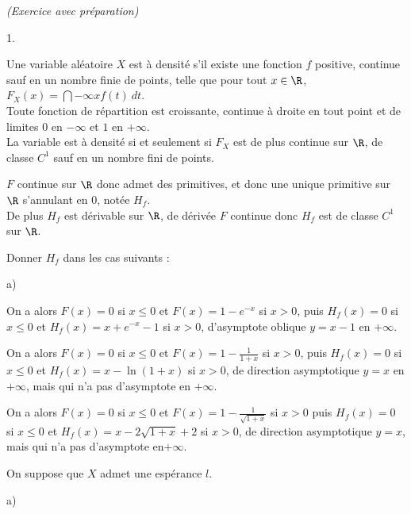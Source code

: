 \documentclass[11pt]{article}%
\begin{document}
 \newpage

 \begin{exercice}{\it (Exercice avec préparation)}~
 \begin{noliste}{1.}
 \setlength{\itemsep}{4mm}
 \item Une variable aléatoire $X$ est à densité s'il existe une
fonction $f$ positive, continue sauf en un nombre finie de points,
telle que pour tout $x \in \R$, $F_{X} ( x) = \dint{-\infty}{x} f(t)\
dt$. \\
 Toute fonction de répartition est croissante, continue à droite en
tout point et de limites $0$ en $-\infty$ et $1$ en $ + \infty$. \\
 La variable est à densité si et seulement si $F_{X}$ est de plus
continue sur $\R$, de classe $C^{1}$ sauf en un nombre fini de points.
\\
 \item $F$ continue sur $\R$ donc admet des primitives, et donc une
unique primitive sur $\R$ s'annulant en 0, notée $H_{f}$. \\
 De plus $H_{f}$ est dérivable sur $\R$, de dérivée $F$ continue donc
$H_{f}$ est de classe $C^{1}$ sur $\R$. \\
 \item Donner $H_{f}$ dans les cas suivants : 
 \begin{noliste}{a)}
 \setlength{\itemsep}{2mm} 
 \item On a alors $F(x) = 0$ si $x \leq 0$ et $F(x) = 1 - e^{-x}$ si $x
>0$, puis $H_{f}(x) = 0$ si $x \leq 0$ et $H_{f}(x) = x + e^{-x} - 1$
si $x > 0$, d'asymptote oblique $y = x -1$ en $ + \infty$. \\
 \item On a alors $F(x) = 0$ si $x \leq 0$ et $F(x) = 1 - \frac{1}{1 +
x}$ si $x >0$, puis $H_{f}(x) = 0$ si $x \leq 0$ et $H_{f}(x) = x - \ln
(1 + x)$ si $x > 0$, de direction asymptotique $y = x$ en $ + \infty$,
mais qui n'a pas d'asymptote en $ + \infty$. \\
 \item On a alors $F(x) = 0$ si $x \leq 0$ et $F(x) = 1 -
\frac{1}{\sqrt{1 + x} }$ si $x > 0$ puis $H_{f}(x) = 0$ si $x \leq 0$
et $H_{f}(x) = x - 2 \sqrt{1 + x} + 2$ si $x > 0$, de direction
asymptotique $y = x$, mais qui n'a pas d'asymptote en$ + \infty$. \\
 \end{noliste}
 \item On suppose que $X$ admet une espérance $l$. \begin{noliste}{a)}
 \setlength{\itemsep}{2mm}

\end{noliste}
\end{noliste}
\end{exercice}
\end{document}
